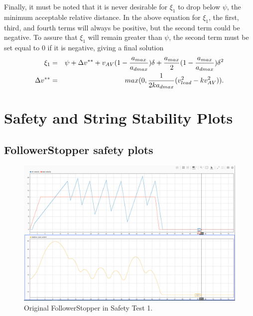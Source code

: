 \documentclass[conference]{IEEEtran}
\begin{document}
\begin{appendix}
Finally, it must be noted that it is never desirable for $\xi_1$ to drop below $\psi$, the minimum acceptable relative distance. In the above equation for $\xi_1$, the first, third, and fourth terms will always be positive, but the second term could be negative. To assure that $\xi_1$ will remain greater than $\psi$, the second term must be set equal to 0 if it is negative, giving a final solution
\begin{eqnarray*}
\xi_1 &=& \psi+\Delta v^{**}+v_{AV}(1-{a_{max}\over a_{dmax}})\delta+{a_{max}\over 2}(1-{a_{max}\over a_{dmax}})\delta^2 \\
\Delta v^{**} &=& max(0,{1\over 2ka_{dmax}}(v_{lead}^2-kv_{AV}^2)).
\end{eqnarray*}



\section{Safety and String Stability Plots}
\subsection{FollowerStopper safety plots}

\begin{figure}[htbp]
\centerline{\includegraphics[width=6.50 in]{oldFS_safety1.png}}
\caption{Original FollowerStopper in Safety Test 1.}
\label{fig3}
\end{figure}


\end{appendix}
\end{document}
